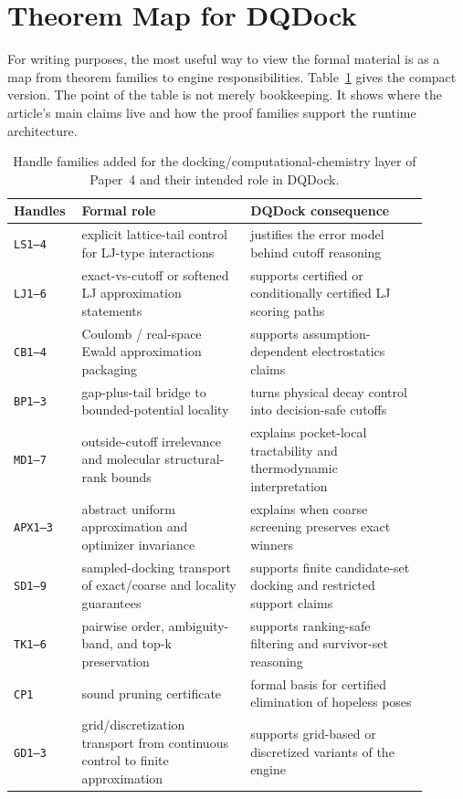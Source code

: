 \section{Theorem Map for DQDock}\label{sec:theorem-map}

For writing purposes, the most useful way to view the formal material is as a map from theorem families to engine responsibilities. Table~\ref{tab:theorem-map} gives the compact version. The point of the table is not merely bookkeeping. It shows where the article's main claims live and how the proof families support the runtime architecture.

\begin{table}[t]
\centering
\small
\begin{tabular}{@{}p{0.12\linewidth}p{0.38\linewidth}p{0.40\linewidth}@{}}
\toprule
\textbf{Handles} & \textbf{Formal role} & \textbf{DQDock consequence} \\
\midrule
\texttt{LS1--4} & explicit lattice-tail control for LJ-type interactions & justifies the error model behind cutoff reasoning \\
\texttt{LJ1--6} & exact-vs-cutoff or softened LJ approximation statements & supports certified or conditionally certified LJ scoring paths \\
\texttt{CB1--4} & Coulomb / real-space Ewald approximation packaging & supports assumption-dependent electrostatics claims \\
\texttt{BP1--3} & gap-plus-tail bridge to bounded-potential locality & turns physical decay control into decision-safe cutoffs \\
\texttt{MD1--7} & outside-cutoff irrelevance and molecular structural-rank bounds & explains pocket-local tractability and thermodynamic interpretation \\
\texttt{APX1--3} & abstract uniform approximation and optimizer invariance & explains when coarse screening preserves exact winners \\
\texttt{SD1--9} & sampled-docking transport of exact/coarse and locality guarantees & supports finite candidate-set docking and restricted support claims \\
\texttt{TK1--6} & pairwise order, ambiguity-band, and top-k preservation & supports ranking-safe filtering and survivor-set reasoning \\
\texttt{CP1} & sound pruning certificate & formal basis for certified elimination of hopeless poses \\
\texttt{GD1--3} & grid/discretization transport from continuous control to finite approximation & supports grid-based or discretized variants of the engine \\
\bottomrule
\end{tabular}
\caption{Handle families added for the docking/computational-chemistry layer of Paper~4 and their intended role in DQDock.}
\label{tab:theorem-map}
\end{table}

